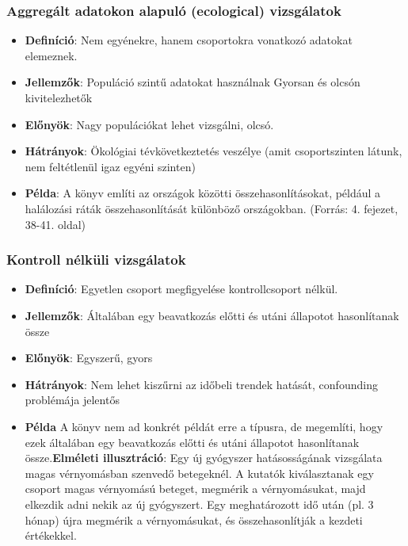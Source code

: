 \documentclass[a4paper,12pt]{article}
\begin{document}
    \subsubsection{Aggregált adatokon alapuló (ecological) vizsgálatok}

    \begin{itemize}

        \item  \textbf{Definíció}: Nem egyénekre, hanem csoportokra vonatkozó adatokat elemeznek.

        \item \textbf{Jellemzők}:
        Populáció szintű adatokat használnak
        Gyorsan és olcsón kivitelezhetők

        \item \textbf{Előnyök}: Nagy populációkat lehet vizsgálni, olcsó.

        \item \textbf{Hátrányok}: Ökológiai tévkövetkeztetés veszélye (amit csoportszinten látunk, nem feltétlenül igaz egyéni szinten)

        \item \textbf{Példa}: A könyv említi az országok közötti összehasonlításokat, például a halálozási ráták összehasonlítását különböző országokban. (Forrás: 4. fejezet, 38-41. oldal)


    \end{itemize}

    \subsubsection{Kontroll nélküli vizsgálatok}

    \begin{itemize}

        \item \textbf{Definíció}: Egyetlen csoport megfigyelése kontrollcsoport nélkül.

        \item \textbf{Jellemzők}:
        Általában egy beavatkozás előtti és utáni állapotot hasonlítanak össze

        \item \textbf{Előnyök}: Egyszerű, gyors

        \item \textbf{Hátrányok}: Nem lehet kiszűrni az időbeli trendek hatását, confounding problémája jelentős

        \item \textbf{Példa}
        A könyv nem ad konkrét példát erre a típusra, de megemlíti, hogy ezek általában egy beavatkozás előtti és utáni állapotot hasonlítanak össze.\textbf{Elméleti illusztráció}: Egy új gyógyszer hatásosságának vizsgálata magas vérnyomásban szenvedő betegeknél. A kutatók kiválasztanak egy csoport magas vérnyomású beteget, megmérik a vérnyomásukat, majd elkezdik adni nekik az új gyógyszert. Egy meghatározott idő után (pl. 3 hónap) újra megmérik a vérnyomásukat, és összehasonlítják a kezdeti értékekkel.

    \end{itemize}
\end{document}
